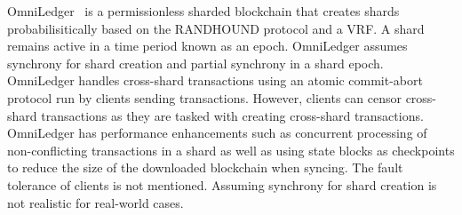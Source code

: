 \documentclass[11pt,dvipdfm]{article}
\begin{document}
OmniLedger~\cite{KJGG17} is a permissionless sharded blockchain that creates shards probabilisitically based on the RANDHOUND protocol and a VRF. A shard remains active in a time period known as an epoch. OmniLedger assumes synchrony for shard creation and partial synchrony in a shard epoch. OmniLedger handles cross-shard transactions using an atomic commit-abort protocol run by clients sending transactions.
However, clients can censor cross-shard transactions as they are tasked with creating cross-shard transactions.
OmniLedger has performance enhancements such as concurrent processing of non-conflicting transactions in a shard as well as using state blocks as checkpoints to reduce the size of the downloaded blockchain when syncing.
The fault tolerance of clients is not mentioned. Assuming synchrony for shard creation is not realistic for real-world cases.  


\end{document}

